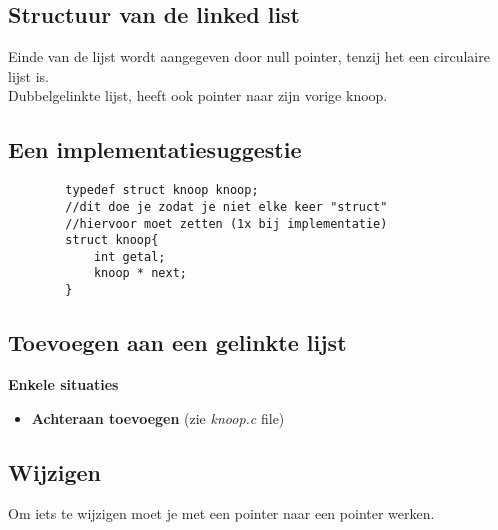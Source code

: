 \documentclass{article}
\begin{document}
\subsection{Structuur van de linked list}
Einde van de lijst wordt aangegeven door null pointer, tenzij het een circulaire lijst is.
\\
Dubbelgelinkte lijst, heeft ook pointer naar zijn vorige knoop.
\subsection{Een implementatiesuggestie}
    \begin{lstlisting}
        typedef struct knoop knoop;
        //dit doe je zodat je niet elke keer "struct"
        //hiervoor moet zetten (1x bij implementatie)
        struct knoop{
            int getal;
            knoop * next; 
        }
    \end{lstlisting}
\subsection{Toevoegen aan een gelinkte lijst}
    \textbf{Enkele situaties}
    \begin{itemize}
        \item \textbf{Achteraan toevoegen} (zie \textit{knoop.c} file)
    \end{itemize}
\subsection{Wijzigen}
    Om iets te wijzigen moet je met een pointer naar een pointer werken.
\end{document}
